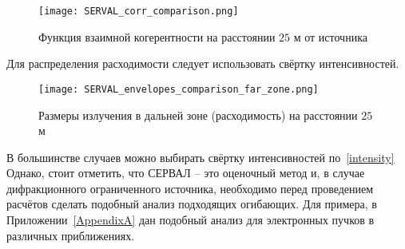\begin{figure}[H] 
	\centering 	\texttt{[image: SERVAL\_corr\_comparison.png]}
	\caption{Функция взаимной когерентности на расстоянии $25$ м от источника}
	\label{fig:SERVAL_corr_comparison}
\end{figure}
\noindent Для распределения расходимости следует использовать свёртку интенсивностей.
\begin{figure}[H] 
	\centering 	\texttt{[image: SERVAL\_envelopes\_comparison\_far\_zone.png]}
	\caption{Размеры излучения в дальней зоне (расходимость) на расстоянии $25$ м}
	\label{fig:SERVAL_envelopes_comparison_far_zone}
\end{figure}
В большинстве случаев можно выбирать свёртку интенсивностей по~\ref{intensity} Однако, стоит отметить, что СЕРВАЛ -- это оценочный метод и, в случае дифракционного ограниченного источника, необходимо перед проведением расчётов сделать подобный анализ подходящих огибающих. Для примера, в Приложении~\ref{AppendixA} дан подобный анализ для электронных пучков в различных приближениях.

